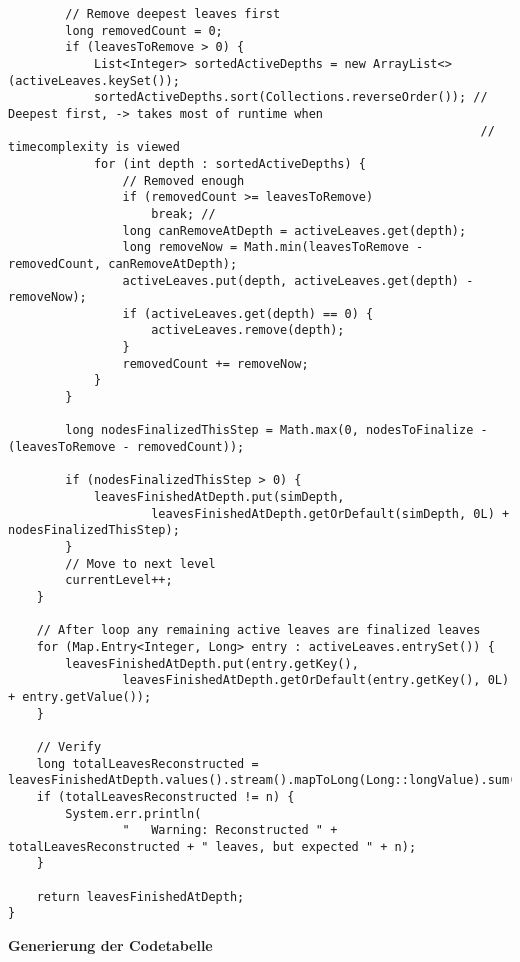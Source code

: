 \documentclass[a4paper,10pt,ngerman]{scrartcl}
\begin{document}
\begin{lstlisting}
        // Remove deepest leaves first
        long removedCount = 0;
        if (leavesToRemove > 0) {
            List<Integer> sortedActiveDepths = new ArrayList<>(activeLeaves.keySet());
            sortedActiveDepths.sort(Collections.reverseOrder()); // Deepest first, -> takes most of runtime when
                                                                  // timecomplexity is viewed
            for (int depth : sortedActiveDepths) {
                // Removed enough
                if (removedCount >= leavesToRemove)
                    break; //
                long canRemoveAtDepth = activeLeaves.get(depth);
                long removeNow = Math.min(leavesToRemove - removedCount, canRemoveAtDepth);
                activeLeaves.put(depth, activeLeaves.get(depth) - removeNow);
                if (activeLeaves.get(depth) == 0) {
                    activeLeaves.remove(depth);
                }
                removedCount += removeNow;
            }
        }

        long nodesFinalizedThisStep = Math.max(0, nodesToFinalize - (leavesToRemove - removedCount));

        if (nodesFinalizedThisStep > 0) {
            leavesFinishedAtDepth.put(simDepth,
                    leavesFinishedAtDepth.getOrDefault(simDepth, 0L) + nodesFinalizedThisStep);
        }
        // Move to next level
        currentLevel++;
    }

    // After loop any remaining active leaves are finalized leaves
    for (Map.Entry<Integer, Long> entry : activeLeaves.entrySet()) {
        leavesFinishedAtDepth.put(entry.getKey(),
                leavesFinishedAtDepth.getOrDefault(entry.getKey(), 0L) + entry.getValue());
    }

    // Verify
    long totalLeavesReconstructed = leavesFinishedAtDepth.values().stream().mapToLong(Long::longValue).sum();
    if (totalLeavesReconstructed != n) {
        System.err.println(
                "   Warning: Reconstructed " + totalLeavesReconstructed + " leaves, but expected " + n);
    }

    return leavesFinishedAtDepth;
}
\end{lstlisting}
\textbf{Generierung der Codetabelle}
\end{document}
